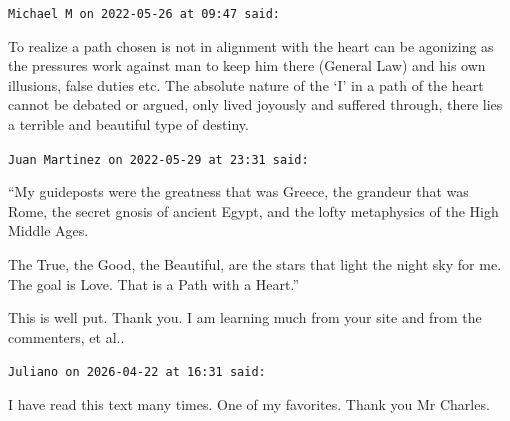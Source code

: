 \begin{footnotesize}
\begin{sffamily}
\texttt{Michael M on 2022-05-26 at 09:47 said:}

To realize a path chosen is not in alignment with the heart can be agonizing as the pressures work against man to keep him there (General Law) and his own illusions, false duties etc. The absolute nature of the `I' in a path of the heart cannot be debated or argued, only lived joyously and suffered through, there lies a terrible and beautiful type of destiny.

\hfill

\texttt{Juan Martinez on 2022-05-29 at 23:31 said:}

``My guideposts were the greatness that was Greece, the grandeur that was Rome, the secret gnosis of ancient Egypt, and the lofty metaphysics of the High Middle Ages.

The True, the Good, the Beautiful, are the stars that light the night sky for me. The goal is Love. That is a Path with a Heart.''

This is well put. Thank you. I am learning much from your site and from the commenters, et al..

\hfill

\texttt{Juliano on 2026-04-22 at 16:31 said:}

I have read this text many times. One of my favorites. Thank you Mr Charles.

\end{sffamily}
\end{footnotesize}

